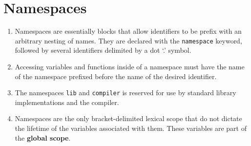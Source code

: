 \section{Namespaces}

\begin{enumerate}
	\item Namespaces are essentially blocks that allow identifiers to be prefix with an arbitrary nesting of names. They are declared with the \lstinline|namespace| keyword, followed by several identifiers delimited by a dot `.' symbol.
	\item Accessing variables and functions inside of a namespace must have the name of the namespace prefixed before the name of the desired identifier.
	\item The namespaces \lstinline|lib| and \lstinline|compiler| is reserved for use by standard library implementations and the compiler.
	\item Namespaces are the only bracket-delimited lexical scope that do not dictate the lifetime of the variables associated with them. These variables are part of the \textbf{global scope}.
\end{enumerate}